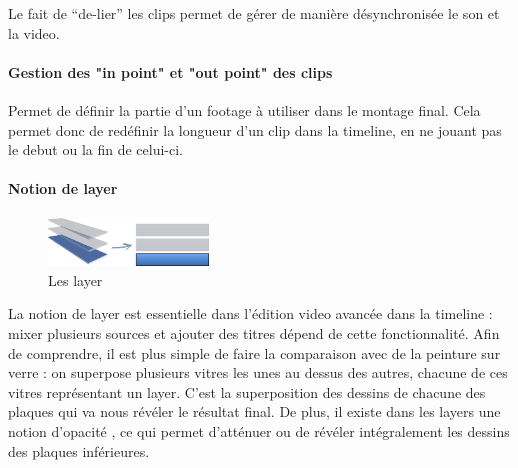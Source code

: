 Le fait de ``de-lier'' les clips permet de gérer de manière
désynchronisée le son et la video.

\paragraph{Gestion des "in point" et  "out point" des clips}

  Permet de définir la partie d'un footage à utiliser dans le montage
  final. Cela permet donc de redéfinir la longueur d'un clip dans la
  timeline, en ne jouant pas le debut ou la fin de celui-ci.

\paragraph{}

\paragraph{Notion de layer}

\begin{figure}

  \begin{center}

    \vspace{-20pt} \includegraphics[width=0.38\textwidth]{images/layers}

  \end{center} \vspace{-20pt} \caption{Les layer} \label{Yes}

\end{figure}

La notion de layer est essentielle dans l'édition video avancée dans
la timeline : mixer plusieurs sources et ajouter des titres dépend de
cette fonctionnalité. Afin de comprendre, il est plus simple de faire
la comparaison avec de la peinture sur verre : on superpose plusieurs
vitres les unes au dessus des autres, chacune de ces vitres représentant
un layer. C'est la superposition des dessins de chacune des plaques
qui va nous révéler le résultat final. De plus, il existe dans les
layers une notion d'opacité , ce qui permet d'atténuer ou de révéler
intégralement les dessins des plaques inférieures.  \newpage

